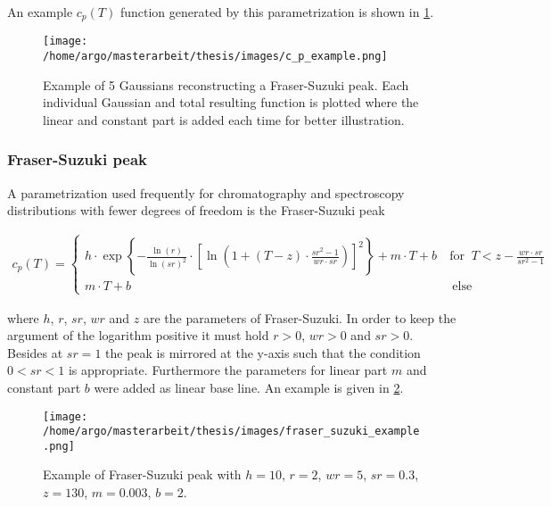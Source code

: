 \documentclass{scrartcl}[12pt, halfparskip]
\numberwithin{equation}{section}
\numberwithin{figure}{section}
\numberwithin{table}{section}
\begin{document}
An example $c_p(T)$ function generated by this parametrization is shown in \cref{fig:parametrization_example_linear_comb_gauss}.


\begin{figure}[H]
	\centering
	\texttt{[image: /home/argo/masterarbeit/thesis/images/c\_p\_example.png]}
	\caption{Example of 5 Gaussians reconstructing a Fraser-Suzuki peak. Each individual Gaussian and total resulting function is plotted where the linear and constant part is added each time for better illustration.}
	\label{fig:parametrization_example_linear_comb_gauss}
\end{figure}



\subsubsection{Fraser-Suzuki peak}
\label{sec:parametrization_FS}

A parametrization used frequently for chromatography and spectroscopy distributions with fewer degrees of freedom is the Fraser-Suzuki peak \cite{fraser_suzuki_1} \cite{fraser_suzuki_many_fcts}

\begin{align}
	c_p(T) =
	\begin{cases}
		h \cdot \exp \left\{ - \frac{\ln(r)}{\ln(sr)^2} \cdot \left[ \ln\left( 1 + (T-z) \cdot \frac{sr^2 - 1}{wr \cdot sr} \right) \right]^2 \right\} + m \cdot T + b \ & \text{for } \ T < z - \frac{wr \cdot sr}{sr^2 - 1} \\
		m \cdot T + b \ & \ \text{else}
	\end{cases}
	\label{eq:fraser_suzuki}
\end{align}

where $h$, $r$, $sr$, $wr$ and $z$ are the parameters of Fraser-Suzuki. In order to keep the argument of the logarithm positive it must hold $r > 0$, $wr > 0$ and $sr > 0$. Besides at $sr = 1$ the peak is mirrored at the y-axis such that the condition $0 < sr < 1$ is appropriate. Furthermore the parameters for linear part $m$ and constant part $b$ were added as linear base line. An example is given in \cref{fig:parametrization_example_fraser_suzuki}.

\begin{figure}[H]
	\centering
	\texttt{[image: /home/argo/masterarbeit/thesis/images/fraser\_suzuki\_example.png]}
	\caption{Example of Fraser-Suzuki peak with $h=10$, $r=2$, $wr=5$, $sr=0.3$, $z=130$, $m=0.003$, $b=2$.}
	\label{fig:parametrization_example_fraser_suzuki}
\end{figure}
\end{document}
